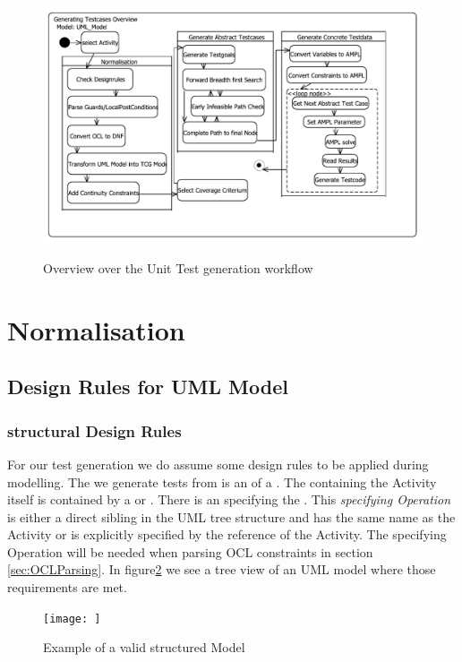 \begin{figure}
\includegraphics[width=\textwidth]{pics/workflow.pdf}
\label{fig:workflowOverview}
\caption{Overview over the Unit Test generation workflow}
\end{figure}
\section{Normalisation}
\label{sec:Normalisation}
\subsection{Design Rules for UML Model} %
\subsubsection{structural Design Rules}
For our test generation we do assume some design rules to be applied during modelling. The  we generate tests from is an  of a . The   containing the Activity itself is contained by a  or . 
There is an  specifying the . This \emph{specifying Operation} is either a direct sibling in the UML tree structure and has the same name as the Activity or is explicitly specified by the  reference of the Activity. The specifying Operation will be needed when parsing OCL constraints in section \ref{sec:OCLParsing}.
In figure\ref{fig:StructureExample} we see a tree view of an UML model where those requirements are met.
\begin{figure}
\label{fig:StructureExample}
\texttt{[image: ]}
\caption{Example of a valid structured Model}
\end{figure}
